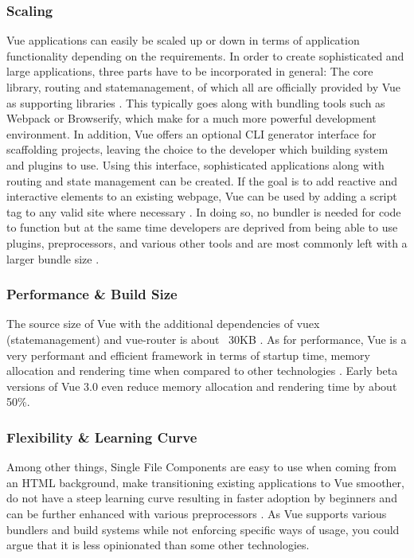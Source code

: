 \subsubsection{Scaling}
Vue applications can easily be scaled up or down in terms of application functionality depending on the requirements. In order to create sophisticated and large applications, three parts have to be incorporated in general: The core library, \gls{routing} and \gls{statemanagement}, of which all are officially provided by Vue as supporting libraries \cite{ComparisonVue:online}. This typically goes along with bundling tools such as Webpack or Browserify, which make for a much more powerful development environment. In addition, Vue offers an optional CLI generator interface for scaffolding projects, leaving the choice to the developer which building system and plugins to use. Using this interface, sophisticated applications along with routing and state management can be created. If the goal is to add reactive and interactive elements to an existing webpage, Vue can be used by adding a script tag to any valid site where necessary \cites{AddingReact:online, ComparisonVue:online}. In doing so, no bundler is needed for code to function but at the same time developers are deprived from being able to use plugins, preprocessors, and various other tools and are most commonly left with a larger bundle size \cite{ComparisonVue:online}.

\subsubsection{Performance \& Build Size}
The source size of Vue with the additional dependencies of vuex (\gls{statemanagement}) and vue-router is about ~30KB \cite{ComparisonVue:online}. As for performance, Vue is a very performant and efficient framework in terms of startup time, memory allocation and rendering time when compared to other technologies \cite{FrameworksPerformance:online}. Early beta versions of Vue 3.0 even reduce memory allocation and rendering time by about 50\%.

\subsubsection{Flexibility \& Learning Curve}
Among other things, Single File Components are easy to use when coming from an HTML background, make transitioning existing applications to Vue smoother, do not have a steep learning curve resulting in faster adoption by beginners and can be further enhanced with various preprocessors \cite{ComparisonVue:online}. As Vue supports various bundlers and build systems while not enforcing specific ways of usage, you could argue that it is less opinionated than some other technologies. 

